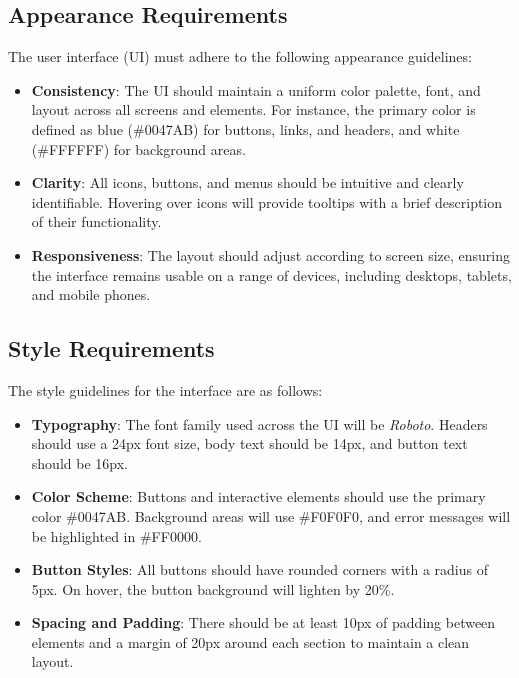 \documentclass[12pt]{article}
\begin{document}
\subsection{Appearance Requirements}
The user interface (UI) must adhere to the following appearance guidelines:
\begin{itemize}
    \item \textbf{Consistency}: The UI should maintain a uniform color palette, 
    font, and layout across all screens and elements. For instance, the primary 
    color is defined as blue (\#0047AB) for buttons, links, and headers, and 
    white (\#FFFFFF) for background areas.
    
    \item \textbf{Clarity}: All icons, buttons, and menus should be intuitive and 
    clearly identifiable. Hovering over icons will provide tooltips with a brief 
    description of their functionality.
    
    \item \textbf{Responsiveness}: The layout should adjust according to screen 
    size, ensuring the interface remains usable on a range of devices, including 
    desktops, tablets, and mobile phones.
\end{itemize}

\subsection{Style Requirements}
The style guidelines for the interface are as follows:
\begin{itemize}
    \item \textbf{Typography}: The font family used across the UI will be 
    \textit{Roboto}. Headers should use a 24px font size, body text should be 
    14px, and button text should be 16px.
    
    \item \textbf{Color Scheme}: Buttons and interactive elements should use the 
    primary color \#0047AB. Background areas will use \#F0F0F0, and error 
    messages will be highlighted in \#FF0000.
    
    \item \textbf{Button Styles}: All buttons should have rounded corners with 
    a radius of 5px. On hover, the button background will lighten by 20\%.
    
    \item \textbf{Spacing and Padding}: There should be at least 10px of padding 
    between elements and a margin of 20px around each section to maintain a clean 
    layout.
\end{itemize}
\end{document}

